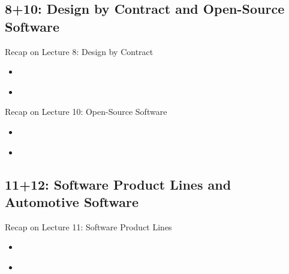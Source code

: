 \subsection{8+10: Design by Contract and Open-Source Software}
\begin{frame}{Recap on Lecture 8: Design by Contract}
	\begin{fancycolumns}
		\begin{note}{}
			\begin{itemize}
				\item 
			\end{itemize}
		\end{note}
		\nextcolumn
		\begin{note}{}
			\begin{itemize}
				\item 
			\end{itemize}
		\end{note}
	\end{fancycolumns}
\end{frame}

\begin{frame}{Recap on Lecture 10: Open-Source Software}
	\begin{fancycolumns}
		\begin{note}{}
			\begin{itemize}
				\item 
			\end{itemize}
		\end{note}
		\nextcolumn
		\begin{note}{}
			\begin{itemize}
				\item 
			\end{itemize}
		\end{note}
	\end{fancycolumns}
\end{frame}

\subsection{11+12: Software Product Lines and Automotive Software}
\begin{frame}{Recap on Lecture 11: Software Product Lines}
	\begin{fancycolumns}
		\begin{note}{}
			\begin{itemize}
				\item 
			\end{itemize}
		\end{note}
		\nextcolumn
		\begin{note}{}
			\begin{itemize}
				\item 
			\end{itemize}
		\end{note}
	\end{fancycolumns}
\end{frame}

